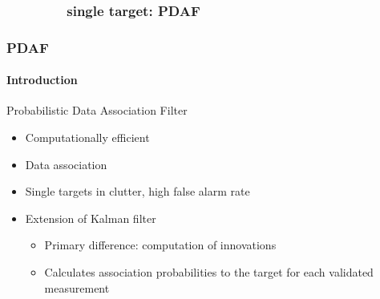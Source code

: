 \subsubsection{\ \ \ \ \ \ \ \ single target: PDAF}
\begin{frame}
\frametitle{PDAF}
\framesubtitle{Introduction}
\logoCSIPCPL\mypagenum
	{\color{red} Probabilistic Data Association Filter}
	\begin{itemize}
		\item Computationally efficient 
		\item Data association
		\item Single targets in clutter, high false alarm rate
		\item Extension of Kalman filter
		\begin{itemize}
			\item Primary difference: computation of innovations
			\item Calculates association probabilities to the target for each validated measurement
		\end{itemize}
	\end{itemize}
\end{frame}







